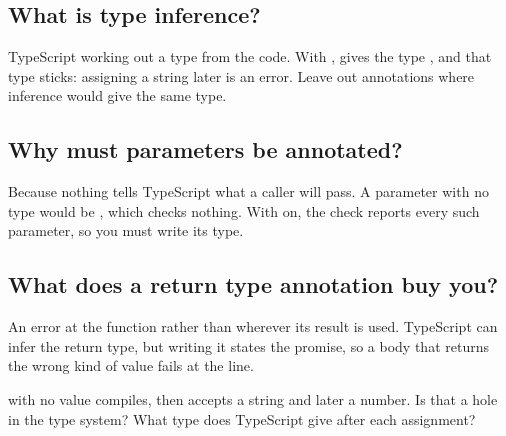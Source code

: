 \label{ch:c16}

\subsection{What is type inference?}%
TypeScript working out a type from the code. With ,  gives  the type , and that type sticks: assigning a string later is an error. Leave out annotations where inference would give the same type.

\subsection{Why must parameters be annotated?}%
Because nothing tells TypeScript what a caller will pass. A parameter with no type would be , which checks nothing. With  on, the  check reports every such parameter, so you must write its type.

\subsection{What does a return type annotation buy you?}%
An error at the function rather than wherever its result is used. TypeScript can infer the return type, but writing it states the promise, so a body that returns the wrong kind of value fails at the  line.

\begin{ponder} with no value compiles, then accepts a string and later a number. Is that a hole in the type system? What type does TypeScript give  after each assignment?\end{ponder}
